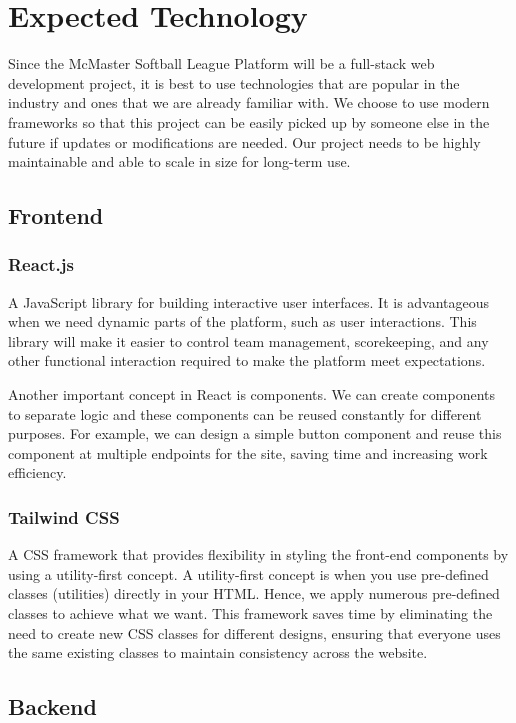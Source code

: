 \documentclass{article}
\begin{document}
\section{Expected Technology}
Since the McMaster Softball League Platform will be a full-stack web development project, it is best to use technologies that are popular in the industry and ones that we are already familiar with. We choose to use modern frameworks so that this project can be easily picked up by someone else in the future if updates or modifications are needed. Our project needs to be highly maintainable and able to scale in size for long-term use.

\subsection{Frontend}
\subsubsection*{React.js}
A JavaScript library for building interactive user interfaces. It is advantageous when we need dynamic parts of the platform, such as user interactions. This library will make it easier to control team management, scorekeeping, and any other functional interaction required to make the platform meet expectations.

Another important concept in React is components. We can create components to separate logic and these components can be reused constantly for different purposes. For example, we can design a simple button component and reuse this component at multiple endpoints for the site, saving time and increasing work efficiency.

\subsubsection*{Tailwind CSS}
A CSS framework that provides flexibility in styling the front-end components by using a utility-first concept. A utility-first concept is when you use pre-defined classes (utilities) directly in your HTML. Hence, we apply numerous pre-defined classes to achieve what we want. This framework saves time by eliminating the need to create new CSS classes for different designs, ensuring that everyone uses the same existing classes to maintain consistency across the website.

\subsection{Backend}
\end{document}
